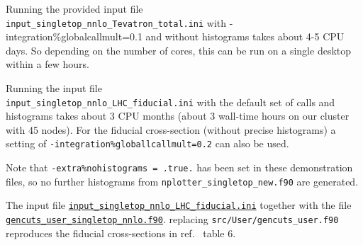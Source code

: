 Running the provided input file \\
\texttt{input\_singletop\_nnlo\_Tevatron\_total.ini} with
-integration\%globalcallmult=0.1 and without histograms takes about 4-5
CPU days. So depending on the number of cores, this can be run on a
single desktop within a few hours.

Running the input file \\
\texttt{input\_singletop\_nnlo\_LHC\_fiducial.ini} with the default set
of calls and histograms takes about 3 CPU months (about 3 wall-time
hours on our cluster with 45 nodes). For the fiducial cross-section
(without precise histograms) a setting of
\texttt{-integration\%globallcallmult=0.2} can also be used.

Note that \texttt{-extra\%nohistograms\ =\ .true.} has been set in these
demonstration files, so no further histograms from
\texttt{nplotter\_singletop\_new.f90} are generated.

The input file \href{\mcfmprocs/Files1610/input_singletop_nnlo_LHC_fiducial.ini}{{\tt input\_singletop\_nnlo\_LHC\_fiducial.ini}} 
together with the file \\
\href{\mcfmprocs/Files1610/gencuts_user_singletop_nnlo.f90}{{\tt gencuts\_user\_singletop\_nnlo.f90}}.
replacing \texttt{src/User/gencuts\_user.f90} reproduces the fiducial
cross-sections in ref.~\cite{Campbell:2020fhf} table 6.


